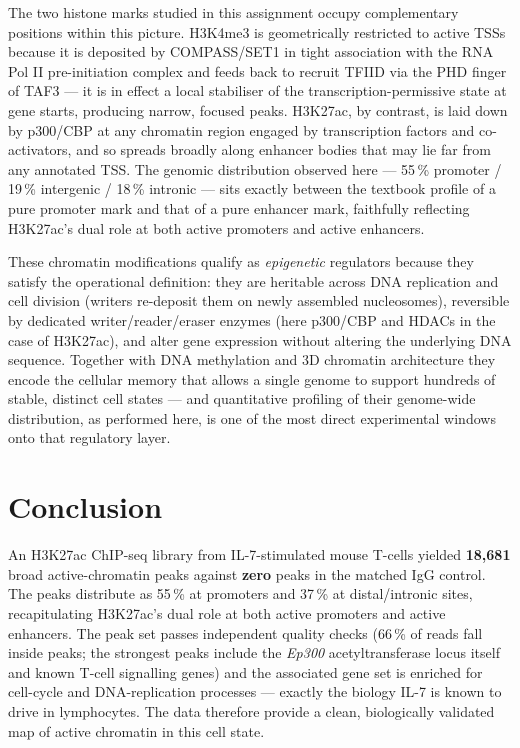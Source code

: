 \documentclass[11pt,a4paper]{article}
\begin{document}
The two histone marks studied in this assignment occupy complementary positions within this picture. H3K4me3 is geometrically restricted to active TSSs because it is deposited by COMPASS/SET1 in tight association with the RNA Pol II pre-initiation complex and feeds back to recruit TFIID via the PHD finger of TAF3 — it is in effect a local stabiliser of the transcription-permissive state at gene starts, producing narrow, focused peaks. H3K27ac, by contrast, is laid down by p300/CBP at any chromatin region engaged by transcription factors and co-activators, and so spreads broadly along enhancer bodies that may lie far from any annotated TSS. The genomic distribution observed here — 55\,\% promoter / 19\,\% intergenic / 18\,\% intronic — sits exactly between the textbook profile of a pure promoter mark and that of a pure enhancer mark, faithfully reflecting H3K27ac's dual role at both active promoters and active enhancers.

These chromatin modifications qualify as \emph{epigenetic} regulators because they satisfy the operational definition: they are heritable across DNA replication and cell division (writers re-deposit them on newly assembled nucleosomes), reversible by dedicated writer/reader/eraser enzymes (here p300/CBP and HDACs in the case of H3K27ac), and alter gene expression without altering the underlying DNA sequence. Together with DNA methylation and 3D chromatin architecture they encode the cellular memory that allows a single genome to support hundreds of stable, distinct cell states — and quantitative profiling of their genome-wide distribution, as performed here, is one of the most direct experimental windows onto that regulatory layer.

\section*{Conclusion}
An H3K27ac ChIP-seq library from IL-7-stimulated mouse T-cells yielded \textbf{18{,}681} broad active-chromatin peaks against \textbf{zero} peaks in the matched IgG control. The peaks distribute as 55\,\% at promoters and 37\,\% at distal/intronic sites, recapitulating H3K27ac's dual role at both active promoters and active enhancers. The peak set passes independent quality checks (66\,\% of reads fall inside peaks; the strongest peaks include the \emph{Ep300} acetyltransferase locus itself and known T-cell signalling genes) and the associated gene set is enriched for cell-cycle and DNA-replication processes — exactly the biology IL-7 is known to drive in lymphocytes. The data therefore provide a clean, biologically validated map of active chromatin in this cell state.
\end{document}
